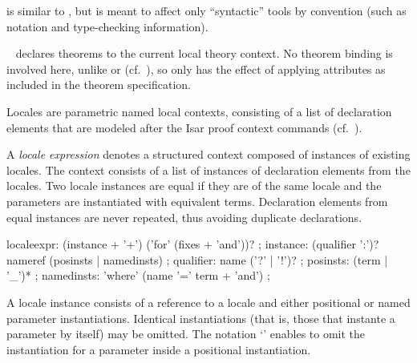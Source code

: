 \begin{isabellebody}
\begin{isamarkuptext}
\begin{description}
  \item \hyperlink{command.syntax-declaration}{\mbox{}} is similar to \hyperlink{command.declaration}{\mbox{}}, but is meant to affect only ``syntactic'' tools by
  convention (such as notation and type-checking information).

  \item \hyperlink{command.declare}{\mbox{}}~ declares theorems to the
  current local theory context.  No theorem binding is involved here,
  unlike \hyperlink{command.theorems}{\mbox{}} or \hyperlink{command.lemmas}{\mbox{}} (cf.\
  ), so \hyperlink{command.declare}{\mbox{}} only has the effect
  of applying attributes as included in the theorem specification.

  \end{description}%
\end{isamarkuptext}%
\isamarkuptrue%
%
\isamarkuptrue%
%
\begin{isamarkuptext}%
Locales are parametric named local contexts, consisting of a list of
  declaration elements that are modeled after the Isar proof context
  commands (cf.\ \secref{sec:proof-context}).%
\end{isamarkuptext}%
\isamarkuptrue%
%
\isamarkupsubsection{Locale expressions \label{sec:locale-expr}%
}
\isamarkuptrue%
%
\begin{isamarkuptext}%
A \emph{locale expression} denotes a structured context composed of
  instances of existing locales.  The context consists of a list of
  instances of declaration elements from the locales.  Two locale
  instances are equal if they are of the same locale and the
  parameters are instantiated with equivalent terms.  Declaration
  elements from equal instances are never repeated, thus avoiding
  duplicate declarations.

  \begin{rail}
    localeexpr: (instance + '+') ('for' (fixes + 'and'))?
    ;
    instance: (qualifier ':')? nameref (posinsts | namedinsts)
    ;
    qualifier: name ('?' | '!')?
    ;
    posinsts: (term | '_')*
    ;
    namedinsts: 'where' (name '=' term + 'and')
    ;
  \end{rail}

  A locale instance consists of a reference to a locale and either
  positional or named parameter instantiations.  Identical
  instantiations (that is, those that instante a parameter by itself)
  may be omitted.  The notation `' enables to omit the
  instantiation for a parameter inside a positional instantiation.


\end{isamarkuptext}
\end{isabellebody}
